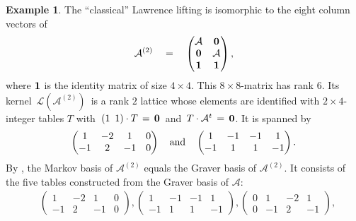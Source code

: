 \documentclass[11pt]{amsart}
\theoremstyle{definition}
\newtheorem{example}[theorem]{Example}
\renewcommand{\L}{{\mathcal L}}
\newcommand{\A}{{\mathcal A}}
\begin{document}
\begin{example}
The ``classical'' Lawrence lifting is isomorphic to the
eight column vectors of
$$ \A^{(2)} \quad = \quad
\begin{pmatrix}
\A & {\bf 0} \\
{\bf 0} & \A \\
{\bf 1} & {\bf 1}
\end{pmatrix},
$$
where ${\bf 1}$ is the identity matrix of size $4\times 4$.
This $8 \times 8$-matrix has rank $6$.
Its kernel $\, \L(\A^{(2)}) \,$ is a rank $2$ lattice
whose elements are identified with
  $2 \times 4$-integer tables $T$
with $\, (1 \,\,\, 1) \cdot T\, = \, {\bf 0} \,$
and $\,T \cdot \A^t \, = \, {\bf 0} $. It is spanned by
$$
  \begin{pmatrix} 1 & -2 & 1 & 0 \\ -1 & 2 & -1 & 0 \end{pmatrix}
\quad \hbox{and} \quad
  \begin{pmatrix} 1 & -1 & -1 & 1 \\ -1 & 1 & 1 & -1 \end{pmatrix}.
$$
By \cite[Theorem~7.1]{Sturmfels-book},
the Markov basis of $\A^{(2)}$ equals the
Graver basis of $\A^{(2)}$. It consists of
the five tables constructed from the Graver basis of $\A$:
  \begin{eqnarray*}
& \begin{pmatrix} 1 & -2 & 1 & 0 \\ -1 & 2 & -1 & 0 \end{pmatrix},
  \begin{pmatrix} 1 & -1 & -1 & 1 \\ -1 & 1 & 1 & -1 \end{pmatrix},
  \begin{pmatrix} 0 & 1 & -2 & 1 \\ 0 & -1 & 2 & -1 \end{pmatrix}, \\

\end{eqnarray*}
\end{example}
\end{document}
